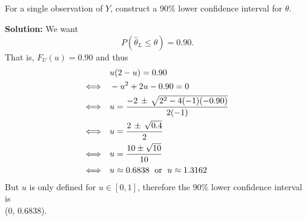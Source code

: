 \subsection{}
    For a single observation of $Y$, construct a 90\% lower confidence interval for $\theta$.
    \begin{mybox}
        \textbf{Solution: } We want
        $$P(\hat{\theta}_L \leq \theta) = 0.90.$$
        That is, $F_U(u) = 0.90$ and thus
        \begin{align}
            & \quad u(2-u) = 0.90\notag\\
            \Longleftrightarrow & \quad -u^2 + 2u - 0.90 = 0 \notag\\
            \Longleftrightarrow & \quad u = \frac{-2\,\pm\,\sqrt{2^2-4(-1)(-0.90)}}{2(-1)} \notag\\
            \Longleftrightarrow & \quad u = \frac{2\,\pm\,\sqrt{0.4}}{2} \notag\\
            \Longleftrightarrow & \quad u = \frac{10 \pm \sqrt{10}}{10} \notag\\
            \Longleftrightarrow & \quad u \approx 0.6838 \;\text{ or }\; u \approx 1.3162\notag
        \end{align}
        But $u$ is only defined for $u \in [0,1]$, therefore the 90\% lower confidence interval is \\(0, 0.6838).
    \end{mybox}